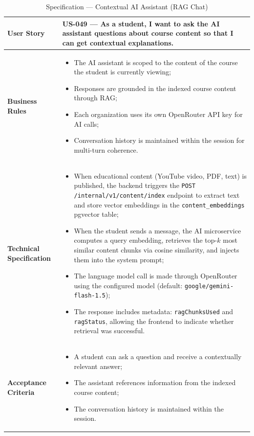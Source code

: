 \begin{table}[H]
\centering
\caption{Specification — Contextual AI Assistant (RAG Chat)}
\label{tab:rag_spec}
\renewcommand{\arraystretch}{1.2}
\begin{tabularx}{\textwidth}{|p{3.5cm}|X|}
\hline
\textbf{User Story} & US-049 — As a student, I want to ask the AI assistant questions about course content so that I can get contextual explanations. \\
\hline
\textbf{Business Rules} &
\begin{itemize}[noitemsep, topsep=2pt]
  \item The AI assistant is scoped to the content of the course the student is
        currently viewing;
  \item Responses are grounded in the indexed course content through RAG;
  \item Each organization uses its own OpenRouter API key for AI calls;
  \item Conversation history is maintained within the session for multi-turn coherence.
\end{itemize} \\
\hline
\textbf{Technical Specification} &
\begin{itemize}[noitemsep, topsep=2pt]
  \item When educational content (YouTube video, PDF, text) is published, the backend
        triggers the \texttt{POST /internal/v1/content/index} endpoint to extract text
        and store vector embeddings in the \texttt{content\_embeddings} pgvector table;
  \item When the student sends a message, the AI microservice computes a query
        embedding, retrieves the top-$k$ most similar content chunks via cosine
        similarity, and injects them into the system prompt;
  \item The language model call is made through OpenRouter using the configured model
        (default: \texttt{google/gemini-flash-1.5});
  \item The response includes metadata: \texttt{ragChunksUsed} and \texttt{ragStatus},
        allowing the frontend to indicate whether retrieval was successful.
\end{itemize} \\
\hline
\textbf{Acceptance Criteria} &
\begin{itemize}[noitemsep, topsep=2pt]
  \item A student can ask a question and receive a contextually relevant answer;
  \item The assistant references information from the indexed course content;
  \item The conversation history is maintained within the session.
\end{itemize} \\
\hline
\end{tabularx}
\end{table}

